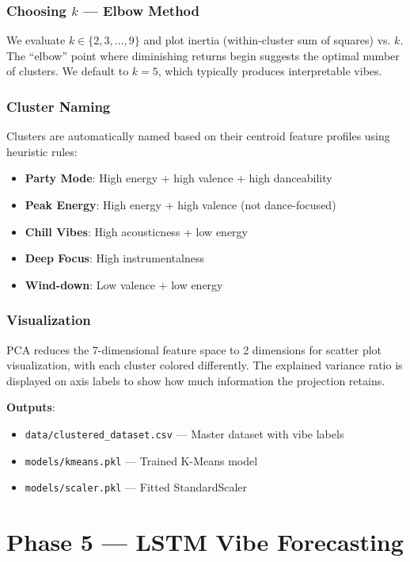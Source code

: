 \documentclass[12pt, a4paper]{article}
\begin{document}
\subsubsection{Choosing $k$ — Elbow Method}
We evaluate $k \in \{2, 3, \ldots, 9\}$ and plot inertia (within-cluster sum of squares) vs. $k$. The ``elbow'' point where diminishing returns begin suggests the optimal number of clusters. We default to $k=5$, which typically produces interpretable vibes.

\subsubsection{Cluster Naming}
Clusters are automatically named based on their centroid feature profiles using heuristic rules:

\begin{itemize}
    \item \textbf{Party Mode}: High energy + high valence + high danceability
    \item \textbf{Peak Energy}: High energy + high valence (not dance-focused)
    \item \textbf{Chill Vibes}: High acousticness + low energy
    \item \textbf{Deep Focus}: High instrumentalness
    \item \textbf{Wind-down}: Low valence + low energy
\end{itemize}

\subsubsection{Visualization}
PCA reduces the 7-dimensional feature space to 2 dimensions for scatter plot visualization, with each cluster colored differently. The explained variance ratio is displayed on axis labels to show how much information the projection retains.

\textbf{Outputs}:
\begin{itemize}
    \item \texttt{data/clustered\_dataset.csv} — Master dataset with vibe labels
    \item \texttt{models/kmeans.pkl} — Trained K-Means model
    \item \texttt{models/scaler.pkl} — Fitted StandardScaler
\end{itemize}

\section{Phase 5 — LSTM Vibe Forecasting}
\end{document}
